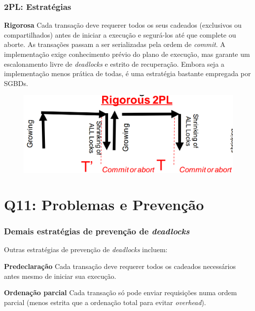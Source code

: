 \documentclass{beamer}
\begin{document}
\begin{frame} %
    \frametitle{2PL: Estratégias}
    \begin{block}{\textbf{Rigorosa}}
        Cada transação deve requerer todos os seus cadeados (exclusivos ou compartilhados) antes de iniciar a execução e segurá-los até que complete ou aborte. As transações passam a ser serializadas pela ordem de \emph{commit}. A implementação exige conhecimento prévio do plano de execução, mas garante um escalonamento livre de \emph{deadlocks} e estrito de recuperação. Embora seja a implementação menos prática de todas, é uma estratégia bastante empregada por SGBDs.

        \medskip
        \begin{figure}
            \includegraphics[width=0.65\linewidth]{rigorous2pl.png}
        \end{figure}
    \end{block}
\end{frame}

\section{Q11: Problemas e Prevenção}


\begin{frame} %
    \frametitle{Demais estratégias de prevenção de \emph{deadlocks}}
    Outras estratégias de prevenção de \emph{deadlocks} incluem:

    \medskip
    \begin{block}{\textbf{Predeclaração}}
        Cada transação deve requerer todos os cadeados necessários antes mesmo de iniciar sua execução.
    \end{block}

    \medskip
    \begin{block}{\textbf{Ordenação parcial}}
        Cada transação só pode enviar requisições numa ordem parcial (menos estrita que a ordenação total para evitar \emph{overhead}).
    \end{block}
\end{frame}
\end{document}
